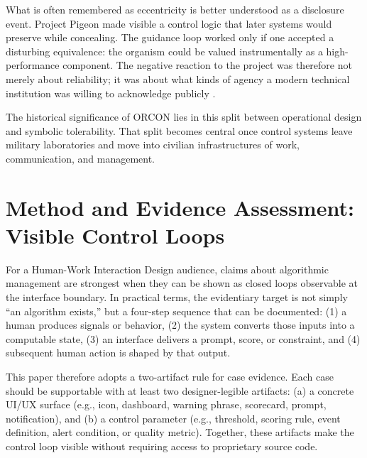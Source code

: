 \documentclass[runningheads]{llncs}
\begin{document}
What is often remembered as eccentricity is better understood as a disclosure event. Project Pigeon made visible a control logic that later systems would preserve while concealing. The guidance loop worked only if one accepted a disturbing equivalence: the organism could be valued instrumentally as a high-performance component. The negative reaction to the project was therefore not merely about reliability; it was about what kinds of agency a modern technical institution was willing to acknowledge publicly \cite{capshew1993engineering,schultzfigueroa2019project,wlodarczyk2020beyond}.

The historical significance of ORCON lies in this split between operational design and symbolic tolerability. That split becomes central once control systems leave military laboratories and move into civilian infrastructures of work, communication, and management.

\section{Method and Evidence Assessment: Visible Control Loops}

For a Human-Work Interaction Design audience, claims about algorithmic management are strongest when they can be shown as closed loops observable at the interface boundary. In practical terms, the evidentiary target is not simply ``an algorithm exists,'' but a four-step sequence that can be documented: (1) a human produces signals or behavior, (2) the system converts those inputs into a computable state, (3) an interface delivers a prompt, score, or constraint, and (4) subsequent human action is shaped by that output.

This paper therefore adopts a two-artifact rule for case evidence. Each case should be supportable with at least two designer-legible artifacts: (a) a concrete UI/UX surface (e.g., icon, dashboard, warning phrase, scorecard, prompt, notification), and (b) a control parameter (e.g., threshold, scoring rule, event definition, alert condition, or quality metric). Together, these artifacts make the control loop visible without requiring access to proprietary source code.
\end{document}

